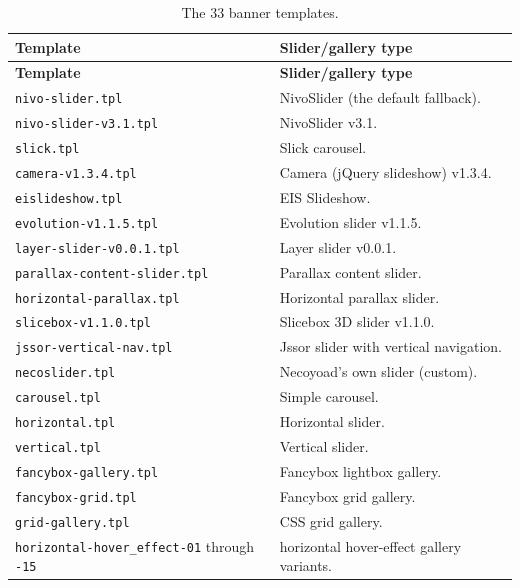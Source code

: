 \documentclass[11pt,a4paper]{article}
\begin{document}
\begin{longtable}{>{\raggedright\arraybackslash}p{5.0cm}>{\raggedright\arraybackslash}p{8.0cm}}
\caption{The 33 banner templates.}\label{tab:banner-templates}\\
\toprule
\textbf{Template} & \textbf{Slider/gallery type} \\
\midrule
\endfirsthead
\toprule
\textbf{Template} & \textbf{Slider/gallery type} \\
\midrule
\endhead
\bottomrule
\endfoot
\texttt{nivo-slider.tpl}         & NivoSlider (the default fallback). \\
\texttt{nivo-slider-v3.1.tpl}    & NivoSlider v3.1. \\
\texttt{slick.tpl}               & Slick carousel. \\
\texttt{camera-v1.3.4.tpl}       & Camera (jQuery slideshow) v1.3.4. \\
\texttt{eislideshow.tpl}         & EIS Slideshow. \\
\texttt{evolution-v1.1.5.tpl}    & Evolution slider v1.1.5. \\
\texttt{layer-slider-v0.0.1.tpl} & Layer slider v0.0.1. \\
\texttt{parallax-content-slider.tpl} & Parallax content slider. \\
\texttt{horizontal-parallax.tpl} & Horizontal parallax slider. \\
\texttt{slicebox-v1.1.0.tpl}     & Slicebox 3D slider v1.1.0. \\
\texttt{jssor-vertical-nav.tpl}  & Jssor slider with vertical navigation. \\
\texttt{necoslider.tpl}          & Necoyoad's own slider (custom). \\
\texttt{carousel.tpl}            & Simple carousel. \\
\texttt{horizontal.tpl}          & Horizontal slider. \\
\texttt{vertical.tpl}            & Vertical slider. \\
\texttt{fancybox-gallery.tpl}    & Fancybox lightbox gallery. \\
\texttt{fancybox-grid.tpl}       & Fancybox grid gallery. \\
\texttt{grid-gallery.tpl}        & CSS grid gallery. \\
\texttt{horizontal-hover\_effect-01} through \texttt{-15} & 15 horizontal hover-effect gallery variants. \\
\bottomrule
\end{longtable}
\end{document}
